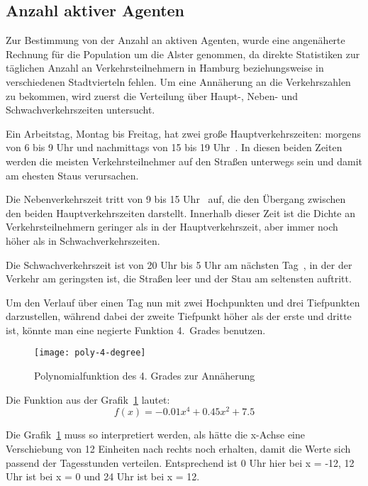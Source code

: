 %


\subsection{Anzahl aktiver Agenten}\label{subsec:activeagents}

Zur Bestimmung von der Anzahl an aktiven Agenten, wurde eine angenäherte Rechnung für die Population um die Alster genommen, da direkte Statistiken zur täglichen Anzahl an Verkehrsteilnehmern in Hamburg beziehungsweise in verschiedenen Stadtvierteln fehlen.
Um eine Annäherung an die Verkehrszahlen zu bekommen, wird zuerst die Verteilung über Haupt-, Neben- und Schwachverkehrszeiten untersucht.

Ein Arbeitstag, Montag bis Freitag, hat zwei große Hauptverkehrszeiten: morgens von 6 bis 9 Uhr und nachmittags von 15 bis 19 Uhr~\cite{FHH2015}.
In diesen beiden Zeiten werden die meisten Verkehrsteilnehmer auf den Straßen unterwegs sein und damit am ehesten Staus verursachen.

Die Nebenverkehrszeit tritt von 9 bis 15 Uhr~\cite{FHH2015} auf, die den Übergang zwischen den beiden Hauptverkehrszeiten darstellt.
Innerhalb dieser Zeit ist die Dichte an Verkehrsteilnehmern geringer als in der Hauptverkehrszeit, aber immer noch höher als in Schwachverkehrszeiten.

Die Schwachverkehrszeit ist von 20 Uhr bis 5 Uhr am nächsten Tag~\cite{FHH2015}, in der der Verkehr am geringsten ist, die Straßen leer und der Stau am seltensten auftritt.


Um den Verlauf über einen Tag nun mit zwei Hochpunkten und drei Tiefpunkten darzustellen, während dabei der zweite Tiefpunkt höher als der erste und dritte ist, könnte man eine negierte Funktion 4.\ Grades benutzen.

\begin{figure}[h]
    \centering
    \texttt{[image: poly-4-degree]}
    \caption{Polynomialfunktion des 4. Grades zur Annäherung}
    \label{fig:poly-4-degree}
\end{figure}

Die Funktion aus der Grafik~\ref{fig:poly-4-degree} lautet: \[f(x)=-0.01x^4+0.45x^2+7.5\]

Die Grafik~\ref{fig:poly-4-degree} muss so interpretiert werden, als hätte die x-Achse eine Verschiebung von 12 Einheiten nach rechts noch erhalten, damit die Werte sich passend der Tagesstunden verteilen.
Entsprechend ist 0 Uhr hier bei x = -12, 12 Uhr ist bei x = 0 und 24 Uhr ist bei x = 12.

